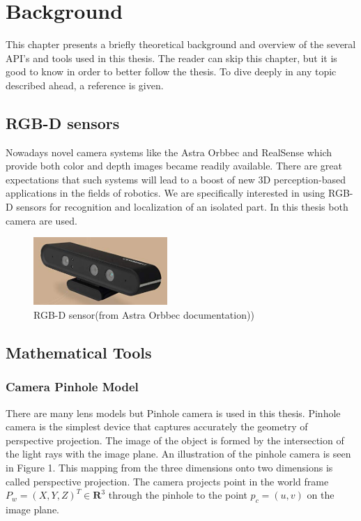 
\chapter{Background}
\label{chap:back}

This chapter presents a briefly theoretical background and overview of the several API's and tools used in this thesis. The reader can skip this chapter, but it is good to know in order to better follow the thesis. To dive deeply in any topic described ahead, a reference is given.

\section{ RGB-D sensors}
Nowadays novel camera systems like the Astra Orbbec and RealSense which provide both color and depth images became readily available. There are great expectations that such systems will lead to a boost of new 3D perception-based applications in the fields of robotics. We are specifically interested in using RGB-D sensors for recognition and localization of an isolated part. In this thesis both camera are used.

\begin{figure}[!h]
\begin{center}
\includegraphics[width=2in]{figures02/astraorbbec.jpg}
\caption{RGB-D sensor(from Astra Orbbec documentation))}%
\end{center}
\end{figure}


\section{ Mathematical Tools}
\subsection{ Camera Pinhole Model}
There are many lens models but Pinhole camera is used in this thesis. Pinhole camera is the simplest device that captures accurately the geometry of perspective projection. The image of the object is formed by the intersection of the light rays with the image plane. An illustration of the pinhole camera is seen in  Figure 1. This mapping from the three dimensions onto two dimensions is called perspective projection. The camera projects point in the world frame $ P_{w}=(X,Y,Z)^{T} \in \textbf{R}^{3}$ through the pinhole to  the point $p_{c}=(u,v)$ on the image plane.
 
